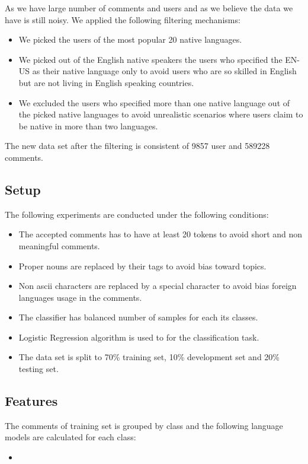 \documentclass[11pt]{article}
\begin{document}
As we have large number of comments and users and as we believe the data we have is still noisy. We applied the following filtering mechanisms:
\begin{itemize}
\item We picked the users of the most popular 20 native languages.
\item We picked out of the English native speakers the users who specified the EN-US as their native language only to avoid users who are so skilled in English but are not living in English speaking countries.
\item We excluded the users who specified more than one native language out of the picked native languages to avoid unrealistic scenarios where users claim to be native in more than two languages.
\end{itemize}

The new data set after the filtering is consistent of 9857 user and 589228 comments.

\subsection{Setup}
The following experiments are conducted under the following conditions:
\begin{itemize}
\item The accepted comments has to have at least 20 tokens to avoid short and non meaningful comments.
\item Proper nouns are replaced by their tags to avoid bias toward topics.
\item Non ascii characters are replaced by a special character to avoid bias foreign languages usage in the comments.
\item The classifier has balanced number of samples for each its classes.
\item Logistic Regression algorithm is used to for the classification task.
\item The data set is split to 70\% training set, 10\% development set and 20\% testing set.
\end{itemize}

\subsection{Features}
The comments of training set is grouped by class and the following language models are calculated for each class:
\begin{itemize}
\item
\end{itemize}
\end{document}
